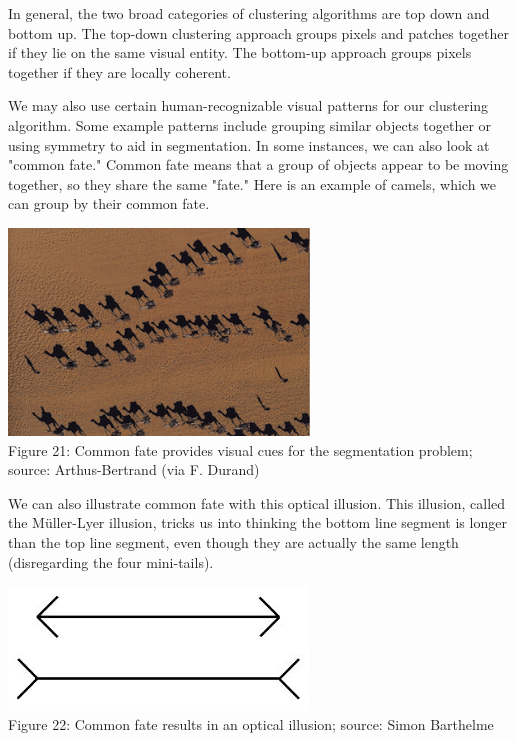 \documentclass{article}
\begin{document}
In general, the two broad categories of clustering algorithms are top down and bottom up. The top-down clustering approach groups pixels and patches together if they lie on the same visual entity. The bottom-up approach groups pixels together if they are locally coherent.

We may also use certain human-recognizable visual patterns for our clustering algorithm. Some example patterns include grouping similar objects together or using symmetry to aid in segmentation. In some instances, we can also look at "common fate." Common fate means that a group of objects appear to be moving together, so they share the same "fate." Here is an example of camels, which we can group by their common fate.

\begin{center}
\includegraphics[width=8cm]{camels.png} \\
Figure 21: Common fate provides visual cues for the segmentation problem; source: Arthus-Bertrand (via F. Durand)
\end{center}

We can also illustrate common fate with this optical illusion. This illusion, called the Müller-Lyer illusion, tricks us into thinking the bottom line segment is longer than the top line segment, even though they are actually the same length (disregarding the four mini-tails).

\begin{center}
\includegraphics[width=8cm]{muller.jpg} \\
Figure 22: Common fate results in an optical illusion; source: Simon Barthelme
\end{center}
\end{document}

